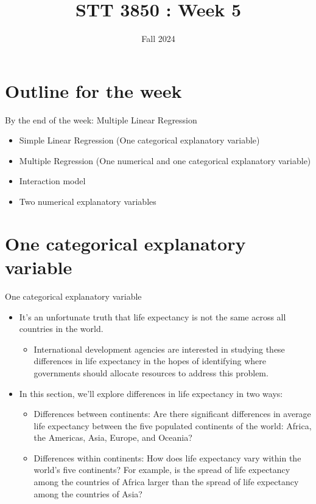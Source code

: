 \documentclass[
  ignorenonframetext,
]{beamer}
\title{STT 3850 : Week 5}
\author{Fall 2024}
\date{}
\institute{Appalachian State University}
\providecommand{\tightlist}{%
  \setlength{\itemsep}{0pt}\setlength{\parskip}{0pt}}
\begin{document}
\frame{\titlepage}

\hypertarget{outline-for-the-week}{%
\section{Outline for the week}\label{outline-for-the-week}}

\begin{frame}{By the end of the week: Multiple Linear Regression}
\protect\hypertarget{by-the-end-of-the-week-multiple-linear-regression}{}
\begin{itemize}
\tightlist
\item
  Simple Linear Regression (One categorical explanatory variable)
\item
  Multiple Regression (One numerical and one categorical explanatory
  variable)
\item
  Interaction model
\item
  Two numerical explanatory variables
\end{itemize}
\end{frame}

\hypertarget{one-categorical-explanatory-variable}{%
\section{One categorical explanatory
variable}\label{one-categorical-explanatory-variable}}

\begin{frame}{One categorical explanatory variable}
\protect\hypertarget{one-categorical-explanatory-variable-1}{}
\begin{itemize}
\item
  It's an unfortunate truth that life expectancy is not the same across
  all countries in the world.

  \begin{itemize}
  \tightlist
  \item
    International development agencies are interested in studying these
    differences in life expectancy in the hopes of identifying where
    governments should allocate resources to address this problem.
  \end{itemize}
\item
  In this section, we'll explore differences in life expectancy in two
  ways:

  \begin{itemize}
  \tightlist
  \item
    Differences between continents: Are there significant differences in
    average life expectancy between the five populated continents of the
    world: Africa, the Americas, Asia, Europe, and Oceania?
  \item
    Differences within continents: How does life expectancy vary within
    the world's five continents? For example, is the spread of life
    expectancy among the countries of Africa larger than the spread of
    life expectancy among the countries of Asia?
  \end{itemize}
\end{itemize}
\end{frame}
\end{document}
